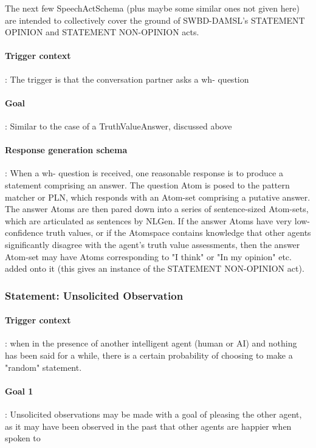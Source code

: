 \documentclass[10pt]{article}
\begin{document}
The next few SpeechActSchema (plus maybe some similar ones not given here) are intended to collectively cover the ground of SWBD-DAMSL's STATEMENT OPINION and STATEMENT NON-OPINION acts.

\paragraph{Trigger context}: The trigger is that the conversation partner asks a wh- question

\paragraph{Goal}: Similar to the case of a TruthValueAnswer, discussed above

\paragraph{Response generation schema}:  When a wh- question is received, one reasonable response is to produce a statement comprising an answer.  The question Atom is posed to the pattern matcher or PLN, which responds with an Atom-set comprising a putative answer.  The answer Atoms are then pared down into a series of sentence-sized Atom-sets, which are articulated as sentences by NLGen.  If the answer Atoms have very low-confidence truth values, or if the Atomspace contains knowledge that other agents significantly disagree with the agent's truth value assessments, then the answer Atom-set may have Atoms corresponding to "I think" or "In my opinion" etc. added onto it (this gives an instance of the STATEMENT NON-OPINION act).

\subsubsection{Statement: Unsolicited Observation}

\paragraph{Trigger context}: when in the presence of another intelligent agent (human or AI) and nothing has been said for a while, there is a certain probability of choosing to make a "random" statement.  

\paragraph{Goal 1}: Unsolicited observations may be made with a goal of pleasing the other agent, as it may have been observed in the past that other agents are happier when spoken to
\end{document}

